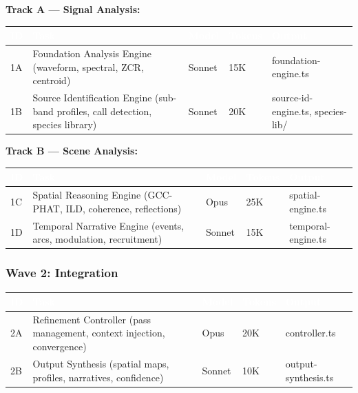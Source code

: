 \documentclass[11pt,letterpaper]{article}
\newcommand{\tableheader}[1]{\textbf{\sffamily\textcolor{white}{#1}}}
\begin{document}
\textbf{Track A --- Signal Analysis:}

\begin{center}
\begin{tabularx}{\textwidth}{C{0.8cm}L{3cm}L{2cm}C{1.5cm}X}
\toprule
{}
\tableheader{ID} & \tableheader{Task} & \tableheader{Model} & \tableheader{Tokens} & \tableheader{Output} \\
\midrule
1A & Foundation Analysis Engine (waveform, spectral, ZCR, centroid) & Sonnet & 15K & foundation-engine.ts \\
1B & Source Identification Engine (sub-band profiles, call detection, species library) & Sonnet & 20K & source-id-engine.ts, species-lib/ \\
\bottomrule
\end{tabularx}
\end{center}

\textbf{Track B --- Scene Analysis:}

\begin{center}
\begin{tabularx}{\textwidth}{C{0.8cm}L{3cm}L{2cm}C{1.5cm}X}
\toprule
{}
\tableheader{ID} & \tableheader{Task} & \tableheader{Model} & \tableheader{Tokens} & \tableheader{Output} \\
\midrule
1C & Spatial Reasoning Engine (GCC-PHAT, ILD, coherence, reflections) & Opus & 25K & spatial-engine.ts \\
1D & Temporal Narrative Engine (events, arcs, modulation, recruitment) & Sonnet & 15K & temporal-engine.ts \\
\bottomrule
\end{tabularx}
\end{center}

\subsubsection{Wave 2: Integration}

\begin{center}
\begin{tabularx}{\textwidth}{C{0.8cm}L{3cm}L{2cm}C{1.5cm}X}
\toprule
{}
\tableheader{ID} & \tableheader{Task} & \tableheader{Model} & \tableheader{Tokens} & \tableheader{Output} \\
\midrule
2A & Refinement Controller (pass management, context injection, convergence) & Opus & 20K & controller.ts \\
2B & Output Synthesis (spatial maps, profiles, narratives, confidence) & Sonnet & 10K & output-synthesis.ts \\
\bottomrule
\end{tabularx}
\end{center}
\end{document}
